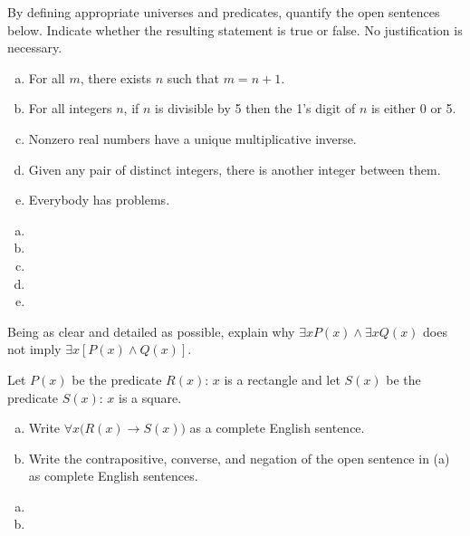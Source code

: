\documentclass[11pt,letterpaper]{article}
\begin{document}
\newpage



 By defining appropriate universes and predicates, quantify the open sentences below. Indicate whether the resulting statement is true or false. No justification is necessary. 
	\begin{enumerate}[(a)]
	\item For all $m$, there exists $n$ such that $m= n + 1$.
	\item For all integers $n$, if $n$ is divisible by 5 then the 1's digit of $n$ is either 0 or 5.
	\item Nonzero real numbers have a unique multiplicative inverse. 
	\item Given any pair of distinct integers, there is another integer between them.
	\item Everybody has problems. 
	\end{enumerate} \pspace

\sol
\begin{enumerate}[(a)]
\item 
\item 
\item 
\item 
\item 
\end{enumerate}



\newpage



 Being as clear and detailed as possible, explain why $\exists x P(x) \wedge \exists x Q(x)$ does not imply $\exists x [P(x) \wedge Q(x)]$. \pspace

\sol 



\newpage



 Let $P(x)$ be the predicate $R(x)$: $x$ is a rectangle and let $S(x)$ be the predicate $S(x)$: $x$ is a square. 
	\begin{enumerate}[(a)]
	\item Write $\forall x \big( R(x) \to S(x) \big)$ as a complete English sentence.
	\item Write the contrapositive, converse, and negation of the open sentence in (a) as complete English sentences. 
	\end{enumerate} \pspace

\sol
\begin{enumerate}[(a)]
\item 
\item 
\end{enumerate}
\end{document}
